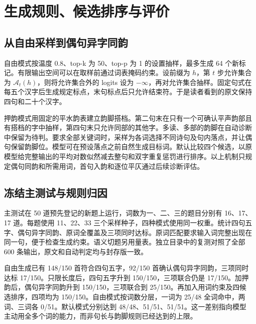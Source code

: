 \section{生成规则、候选排序与评价}
\label{sec:evaluation}

\subsection{从自由采样到偶句异字同韵}

自由模式按温度 0.8、top-k 为 50、top-p 为 1 的设置抽样，最多生成 64 个新标记。有限输出空间可以在取样前通过词表掩码约束。设前缀为 $h$，第 $t$ 步允许集合为 $\mathcal A_t(h)$，则将允许集合外的 logits 设为 $-\infty$，再对允许集合抽样。固定句式在每五个汉字后生成规定标点，末句标点后只允许结束符。于是读者看到的原文保持四句和二十个汉字。

押韵模式用固定的平水韵表建立韵脚搭档。第二句末在只有一个可确认平声韵部且有搭档的字中抽样，第四句末只允许同部的其他字。多读、多部的韵脚在自动诊断中保留为待判。要求全部关键词时，采样为各词选择不同诗句及句内落点，并让偶句保留韵脚位。模型可在预设落点之前自然生成目标词。默认比较四个候选，以原模型给完整输出的平均对数似然减去整句和双字重复惩罚进行排序。以上机制只规定偶句同韵和所需用词，首句入韵和逐位平仄通过后续诊断评估。


\subsection{冻结主测试与规则归因}

主测试在 50 道预先登记的新题上运行，词数为一、二、三的题目分别有 16、17、17 道。每题使用 11、22、33 三个采样种子，四种模式使用同一权重。统计四句五字、偶句异字同韵、原词全覆盖及三项同时达标。原词匹配要求输入词完整出现在同一句，便于检查生成约束。语义切题另用量表。独立目录中的复测对照了全部 600 条输出，原文和自动判定均与封存版一致。


自由生成已有 148/150 首符合四句五字，92/150 首确认偶句异字同韵，三项同时达标 17/150。只限长度后，四句五字升到 150/150，三项联合仍是 17/150。加押韵后，偶句异字同韵升到 150/150，三项联合到 25/150。再加入用词约束及四候选排序，四项均为 150/150。自由模式按词数分层，一词为 25/48 全词命中，两词、三词各 0/51。默认模式分别达到 48/48、51/51、51/51。这一差别指向模型主动用全多个词的能力，而非句长与韵脚规则已经达到的上限。

